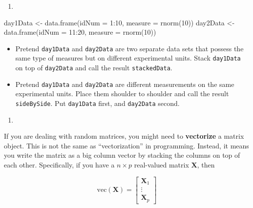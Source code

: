 \documentclass[
  12pt,
  krantz2]{krantz}
\makeatletter
\newenvironment{Shaded}{\begin{snugshade}}{\end{snugshade}}
\newcommand{\AttributeTok}[1]{\textcolor[rgb]{0.61,0.61,0.61}{#1}}
\newcommand{\DecValTok}[1]{\textcolor[rgb]{0.06,0.06,0.06}{#1}}
\newcommand{\FunctionTok}[1]{\textcolor[rgb]{0,0,0}{#1}}
\newcommand{\NormalTok}[1]{#1}
\newcommand{\OtherTok}[1]{\textcolor[rgb]{0.37,0.37,0.37}{#1}}
\newcommand{\SpecialCharTok}[1]{\textcolor[rgb]{0,0,0}{#1}}
\providecommand{\tightlist}{%
  \setlength{\itemsep}{0pt}\setlength{\parskip}{0pt}}
\newenvironment{kframe}{%
\medskip{}
\setlength{\fboxsep}{.8em}
 \def\at@end@of@kframe{}%
 \ifinner\ifhmode%
  \def\at@end@of@kframe{\end{minipage}}%
  \begin{minipage}{\columnwidth}%
 \fi\fi%
 \def\FrameCommand##1{\hskip\@totalleftmargin \hskip-\fboxsep
 \colorbox{shadecolor}{##1}\hskip-\fboxsep
     \hskip-\linewidth \hskip-\@totalleftmargin \hskip\columnwidth}%
 \MakeFramed {\advance\hsize-\width
   \@totalleftmargin\z@ \linewidth\hsize
   \@setminipage}}%
 {\par\unskip\endMakeFramed%
 \at@end@of@kframe}
\renewenvironment{Shaded}{\begin{kframe}}{\end{kframe}}
\makeatother
\begin{document}
\begin{enumerate}
\def\labelenumi{\arabic{enumi}.}
\setcounter{enumi}{1}
\tightlist
\item
\end{enumerate}

\begin{Shaded}
\begin{Highlighting}[]
\NormalTok{day1Data }\OtherTok{\textless{}{-}} \FunctionTok{data.frame}\NormalTok{(}\AttributeTok{idNum =} \DecValTok{1}\SpecialCharTok{:}\DecValTok{10}\NormalTok{, }
                       \AttributeTok{measure =} \FunctionTok{rnorm}\NormalTok{(}\DecValTok{10}\NormalTok{))}
\NormalTok{day2Data }\OtherTok{\textless{}{-}} \FunctionTok{data.frame}\NormalTok{(}\AttributeTok{idNum =} \DecValTok{11}\SpecialCharTok{:}\DecValTok{20}\NormalTok{, }
                       \AttributeTok{measure =} \FunctionTok{rnorm}\NormalTok{(}\DecValTok{10}\NormalTok{))}
\end{Highlighting}
\end{Shaded}

\begin{itemize}
\tightlist
\item
  Pretend \texttt{day1Data} and \texttt{day2Data} are two separate data sets that possess the same type of measures but on different experimental units. Stack \texttt{day1Data} on top of \texttt{day2Data} and call the result \texttt{stackedData}.
\item
  Pretend \texttt{day1Data} and \texttt{day2Data} are different measurements on the same experimental units. Place them shoulder to shoulder and call the result \texttt{sideBySide}. Put \texttt{day1Data} first, and \texttt{day2Data} second.
\end{itemize}

\begin{enumerate}
\def\labelenumi{\arabic{enumi}.}
\setcounter{enumi}{2}
\tightlist
\item
\end{enumerate}

If you are dealing with random matrices, you might need to \textbf{vectorize} a matrix object. This is not the same as ``vectorization'' in programming. Instead, it means you write the matrix as a big column vector by stacking the columns on top of each other. Specifically, if you have a \(n \times p\) real-valued matrix \(\mathbf{X}\), then

\begin{equation} 
\text{vec}(\mathbf{X}) =\begin{bmatrix} \mathbf{X}_1 \\ \vdots \\ \mathbf{X}_p \end{bmatrix} 
\end{equation}
\end{document}
